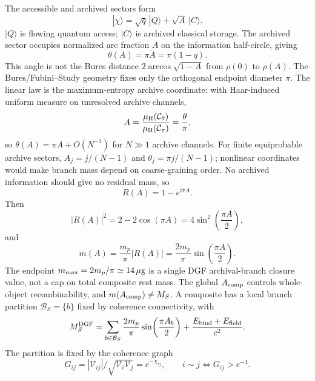 \documentclass[aps,prl,twocolumn,superscriptaddress,nofootinbib,floatfix]{revtex4-2}
\begin{document}
The accessible and archived sectors form
\begin{equation}
|\chi\rangle=\sqrt q\,|Q\rangle+\sqrt A\,|C\rangle.
\end{equation}
$|Q\rangle$ is flowing quantum access; $|C\rangle$ is archived classical storage. The archived sector occupies normalized arc fraction $A$ on the information half-circle, giving
\begin{equation}
\boxed{\theta(A)=\pi A=\pi(1-q).}
\end{equation}
This angle is not the Bures distance $2\arccos\sqrt{1-A}$ from $\rho(0)$ to $\rho(A)$. The Bures/Fubini--Study geometry fixes only the orthogonal endpoint diameter $\pi$. The linear law is the maximum-entropy archive coordinate: with Haar-induced uniform measure on unresolved archive channels,
\begin{equation}
A=\frac{\mu_{\rm H}(\mathcal C_\theta)}
        {\mu_{\rm H}(\mathcal C_\pi)}
=\frac{\theta}{\pi},
\end{equation}
so $\theta(A)=\pi A+O(N^{-1})$ for $N\gg1$ archive channels.
For finite equiprobable archive sectors, $A_j=j/(N-1)$ and $\theta_j=\pi j/(N-1)$; nonlinear coordinates would make branch mass depend on coarse-graining order.
No archived information should give no residual mass, so
\begin{equation}
R(A)=1-e^{i\pi A}.
\end{equation}
Then
\begin{equation}
|R(A)|^2=2-2\cos(\pi A)=4\sin^2\left(\frac{\pi A}{2}\right),
\end{equation}
and
\begin{equation}
\boxed{
m(A)=\frac{m_p}{\pi}|R(A)|
=\frac{2m_p}{\pi}\sin\left(\frac{\pi A}{2}\right).
}
\end{equation}
The endpoint $m_{\max}=2m_p/\pi\simeq14\,\mu{\rm g}$ is a single DGF archival-branch closure value, not a cap on total composite rest mass. The global $A_{\rm comp}$ controls whole-object recombinability, and $m(A_{\rm comp})\neq M_S$. A composite has a local branch partition $\mathcal B_S=\{b\}$ fixed by coherence connectivity, with
\begin{equation}
M_S^{\rm DGF}
=\sum_{b\in\mathcal B_S}
\frac{2m_p}{\pi}\sin\!\left(\frac{\pi A_b}{2}\right)
+\frac{E_{\rm bind}+E_{\rm field}}{c^2}.
\end{equation}
The partition is fixed by the coherence graph
\begin{equation}
G_{ij}=|\mathcal V_{ij}|/\sqrt{\mathcal V_i\mathcal V_j}
=e^{-\chi_{ij}},\qquad
i\sim j\iff G_{ij}>e^{-1}.
\end{equation}
\end{document}
